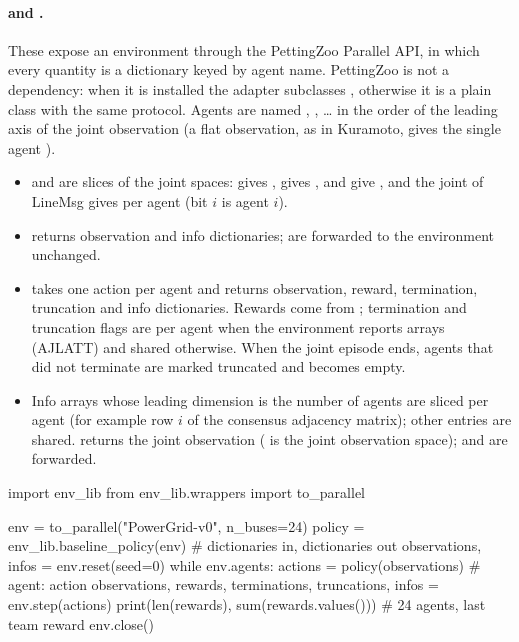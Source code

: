 \paragraph{\texorpdfstring{ and }{ParallelEnvAdapter and to\_parallel}.}
These expose an environment through the PettingZoo Parallel API, in which every
quantity is a dictionary keyed by agent name. PettingZoo is not a dependency:
when it is installed the adapter subclasses ,
otherwise it is a plain class with the same protocol. Agents are named
, , \ldots{} in the order of the leading axis of
the joint observation (a flat observation, as in Kuramoto, gives the single agent
).
\begin{itemize}
  \item {} and  are slices
        of the joint spaces:  gives ,
         gives ,  and
         give , and the joint
         of LineMsg gives  per agent
        (bit $i$ is agent $i$).
  \item {} returns observation and info dictionaries;
         are forwarded to the environment unchanged.
  \item {} takes one action per agent and returns observation,
        reward, termination, truncation and info dictionaries. Rewards come from
        ; termination and truncation flags are per
        agent when the environment reports arrays (AJLATT) and shared otherwise.
        When the joint episode ends, agents that did not terminate are marked
        truncated and  becomes empty.
  \item Info arrays whose leading dimension is the number of agents are sliced per
        agent (for example row $i$ of the consensus adjacency matrix); other
        entries are shared.  returns the joint observation
        ( is the joint observation space);  and
         are forwarded.
\end{itemize}

\begin{pycode}
import env_lib
from env_lib.wrappers import to_parallel

env = to_parallel("PowerGrid-v0", n_buses=24)
policy = env_lib.baseline_policy(env)       # dictionaries in, dictionaries out
observations, infos = env.reset(seed=0)
while env.agents:
    actions = policy(observations)          # {agent: action}
    observations, rewards, terminations, truncations, infos = env.step(actions)
print(len(rewards), sum(rewards.values()))  # 24 agents, last team reward
env.close()
\end{pycode}

